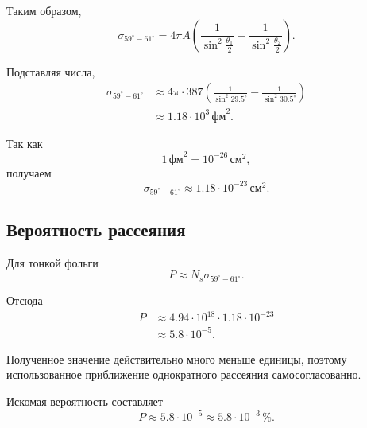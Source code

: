 \documentclass[../final.tex]{subfiles}
\begin{document}
Таким образом,
%
\begin{equation*}
    \sigma_{59^\circ-61^\circ}
    =
    4\pi A
    \left(
        \frac{1}{\sin^2\frac{\theta_1}{2}}
        -
        \frac{1}{\sin^2\frac{\theta_2}{2}}
    \right).
\end{equation*}

Подставляя числа,
%
\begin{align*}
    \sigma_{59^\circ-61^\circ}
    &\approx
    4\pi\cdot387
    \left(
        \frac{1}{\sin^2 29.5^\circ}
        -
        \frac{1}{\sin^2 30.5^\circ}
    \right)
    \\
    &\approx
    1.18\cdot10^3\,\text{фм}^2.
\end{align*}

Так как
%
\begin{equation*}
    1\,\text{фм}^2
    =
    10^{-26}\,\text{см}^2,
\end{equation*}
%
получаем
%
\begin{equation*}
    \sigma_{59^\circ-61^\circ}
    \approx
    1.18\cdot10^{-23}\,\text{см}^2.
\end{equation*}



\subsection*{Вероятность рассеяния}

Для тонкой фольги
%
\begin{equation*}
    P
    \approx
    N_s\sigma_{59^\circ-61^\circ}.
\end{equation*}

Отсюда
%
\begin{align*}
    P
    &\approx
    4.94\cdot10^{18}
    \cdot
    1.18\cdot10^{-23}
    \\
    &\approx
    5.8\cdot10^{-5}.
\end{align*}

Полученное значение действительно много меньше единицы, поэтому
использованное приближение однократного рассеяния самосогласованно.



\answer

Искомая вероятность составляет
%
\begin{equation*}
    P
    \approx
    5.8\cdot10^{-5}
    \approx
    5.8\cdot10^{-3}\,\%.
\end{equation*}
\end{document}
